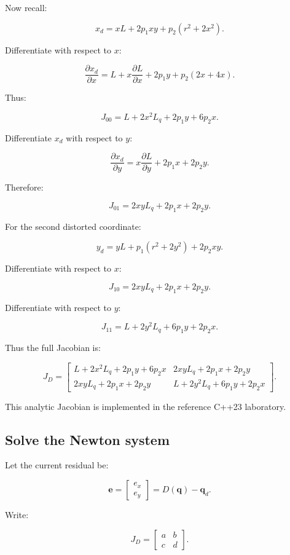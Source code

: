 Now recall:

\[
 x_d=xL+2p_1xy+p_2(r^2+2x^2).
\]

Differentiate with respect to \(x\):

\[
 \frac{\partial x_d}{\partial x} = L+x\frac{\partial L}{\partial x} +2p_1y +p_2(2x+4x).
\]

Thus:

\[
 \boxed{ J_{00}= L+2x^2L_q+2p_1y+6p_2x }.
\]

Differentiate \(x_d\) with respect to \(y\):

\[
 \frac{\partial x_d}{\partial y} = x\frac{\partial L}{\partial y} +2p_1x +2p_2y.
\]

Therefore:

\[
 \boxed{ J_{01}= 2xyL_q+2p_1x+2p_2y }.
\]

For the second distorted coordinate:

\[
 y_d=yL+p_1(r^2+2y^2)+2p_2xy.
\]

Differentiate with respect to \(x\):

\[
 \boxed{ J_{10}= 2xyL_q+2p_1x+2p_2y }.
\]

Differentiate with respect to \(y\):

\[
 \boxed{ J_{11}= L+2y^2L_q+6p_1y+2p_2x }.
\]

Thus the full Jacobian is:

\[
 \boxed{ J_D= \begin{bmatrix} L+2x^2L_q+2p_1y+6p_2x& 2xyL_q+2p_1x+2p_2y\\ 2xyL_q+2p_1x+2p_2y& L+2y^2L_q+6p_1y+2p_2x \end{bmatrix} }.
\]

This analytic Jacobian is implemented in the reference C++23 laboratory.

\subsection{Solve the Newton system}\label{02-foundations-ii-ch035-solve-the-newton-system}

Let the current residual be:

\[
 \mathbf e= \begin{bmatrix} e_x\\e_y \end{bmatrix} = D(\mathbf q)-\mathbf q_d.
\]

Write:

\[
 J_D= \begin{bmatrix} a&b\\c&d \end{bmatrix}.
\]

